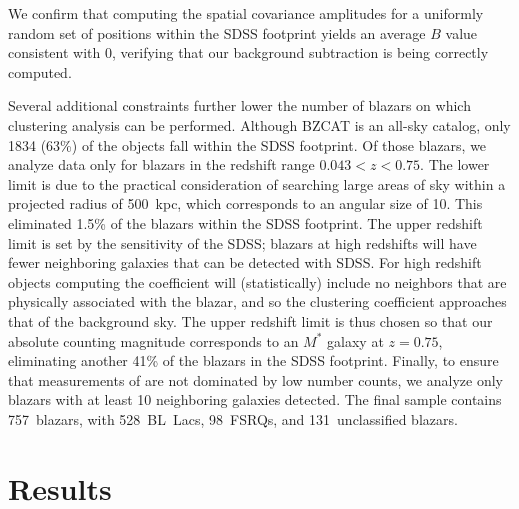 \documentclass{emulateapj}
\begin{document}
We confirm that computing the spatial covariance amplitudes for a uniformly random set of positions within the SDSS footprint yields an average $B$ value consistent with 0, verifying that our background subtraction is being correctly computed. 

Several additional constraints further lower the number of blazars on which clustering analysis can be performed. Although BZCAT is an all-sky catalog, only 1834 (63\%) of the objects fall within the SDSS footprint. Of those blazars, we analyze data only for blazars in the redshift range $0.043<z<0.75$. The lower limit is due to the practical consideration of searching large areas of sky within a projected radius of 500~kpc, which corresponds to an angular size of 10\arcmin. This eliminated 1.5\% of the blazars within the SDSS footprint. The upper redshift limit is set by the sensitivity of the SDSS; blazars at high redshifts will have fewer neighboring galaxies that can be detected with SDSS. For high redshift objects computing the \bgb{} coefficient will (statistically) include no neighbors that are physically associated with the blazar, and so the clustering coefficient approaches that of the background sky. The upper redshift limit is thus chosen so that our absolute counting magnitude corresponds to an $M^*$ galaxy at $z=0.75$, eliminating another 41\% of the blazars in the SDSS footprint. Finally, to ensure that measurements of \bgb{} are not dominated by low number counts, we analyze only blazars with at least 10 neighboring galaxies detected. The final sample contains 757~blazars, with 528~BL~Lacs, 98~FSRQs, and 131~unclassified blazars. 


\section{Results}\label{sec-survey_results}
\end{document}
